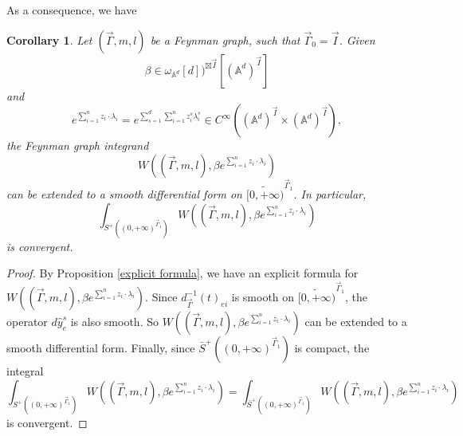 \documentclass[11pt]{amsart}
\newtheorem{cor}[thm]{Corollary}
\theoremstyle{definition}
\theoremstyle{remark}
\numberwithin{equation}{section}
\begin{document}
As a consequence, we have
\begin{cor}
    Let $(\vec{\Gamma},m,l)$ be a Feynman graph, such that $\vec{\Gamma}_{0}=\vec{I}$. Given 
    $$
    \beta\in \omega_{\mathbb{A}^{d}}[d])^{\boxtimes\vec{I}}[(\mathbb{A}^{d})^{\vec{I}}]
    $$
    and
    $$
    e^{\sum_{i=1}^{n}z_{i}\cdot\lambda_{i}}=e^{\sum_{s=1}^{d}\sum_{i=1}^{n}z^{s}_{i}\lambda^{s}_{i}}\in C^{\infty}((\mathbb{A}^{d})^{\vec{I}}\times (\mathbb{A}^{d})^{\vec{I}}),
    $$
    the Feynman graph integrand
    $$
    W((\vec{\Gamma},m,l),\beta e^{\sum_{i=1}^{n}z_{i}\cdot\lambda_{i}})
    $$
    can be extended to a smooth differential form on $\widetilde{[0,+\infty)}^{\vec{\Gamma}_{1}}$. In particular,
    $$
    \int_{S^{+}((0,+\infty)^{\vec{\Gamma}_{1}})}W((\vec{\Gamma},m,l),\beta e^{\sum_{i=1}^{n}z_{i}\cdot\lambda_{i}})
    $$
    is convergent.
\end{cor}
\begin{proof}
    By Proposition \ref{explicit formula}, we have an explicit formula for $
    W((\vec{\Gamma},m,l),\beta e^{\sum_{i=1}^{n}z_{i}\cdot\lambda_{i}})
    $. Since $d^{-1}_{\vec{\Gamma}}(t)_{ei}$ is smooth on $\widetilde{[0,+\infty)}^{\vec{\Gamma}_{1}}$, the operator $d\hat{y}_{e}^{s}$ is also smooth. So $
    W((\vec{\Gamma},m,l),\beta e^{\sum_{i=1}^{n}z_{i}\cdot\lambda_{i}})
    $ can be extended to a smooth differential form. Finally, since $\bar{S}^{+}((0,+\infty)^{\vec{\Gamma}_{1}})$ is compact, the integral
    $$
    \int_{S^{+}((0,+\infty)^{\vec{\Gamma}_{1}})}W((\vec{\Gamma},m,l),\beta e^{\sum_{i=1}^{n}z_{i}\cdot\lambda_{i}})=
    \int_{\bar{S}^{+}((0,+\infty)^{\vec{\Gamma}_{1}})}W((\vec{\Gamma},m,l),\beta e^{\sum_{i=1}^{n}z_{i}\cdot\lambda_{i}})
    $$
    is convergent.
\end{proof}
\end{document}
